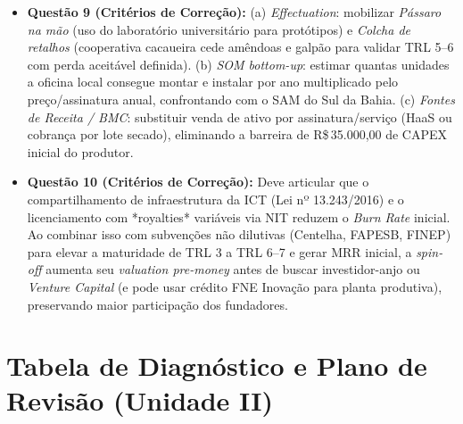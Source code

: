 \begin{boxGabarito}
  \begin{itemize}[leftmargin=1.4em, itemsep=4pt]
    \item \textbf{Questão 9 (Critérios de Correção):}
    (a) \textit{Effectuation}: mobilizar \textit{Pássaro na mão} (uso do laboratório universitário para protótipos) e \textit{Colcha de retalhos} (cooperativa cacaueira cede amêndoas e galpão para validar TRL 5–6 com perda aceitável definida).
    (b) \textit{SOM bottom-up}: estimar quantas unidades a oficina local consegue montar e instalar por ano multiplicado pelo preço/assinatura anual, confrontando com o SAM do Sul da Bahia.
    (c) \textit{Fontes de Receita / BMC}: substituir venda de ativo por assinatura/serviço (HaaS ou cobrança por lote secado), eliminando a barreira de R\$\,35.000,00 de CAPEX inicial do produtor.
    \item \textbf{Questão 10 (Critérios de Correção):}
    Deve articular que o compartilhamento de infraestrutura da ICT (Lei nº 13.243/2016) e o licenciamento com *royalties* variáveis via NIT reduzem o \textit{Burn Rate} inicial. Ao combinar isso com subvenções não dilutivas (Centelha, FAPESB, FINEP) para elevar a maturidade de TRL 3 a TRL 6–7 e gerar MRR inicial, a \textit{spin-off} aumenta seu \textit{valuation pre-money} antes de buscar investidor-anjo ou \textit{Venture Capital} (e pode usar crédito FNE Inovação para planta produtiva), preservando maior participação dos fundadores.
  \end{itemize}
\end{boxGabarito}

\section*{Tabela de Diagnóstico e Plano de Revisão (Unidade II)}

